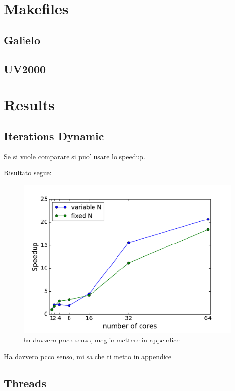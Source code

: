 \documentclass[a4paper,12pt]{article}
\begin{document}
\begin{appendices}

\section{Makefiles} \label{app:makefiles}
\subsection{Galielo}


\newpage
\subsection{UV2000}



\newpage
\section{Results}
\subsection{Iterations Dynamic} \label{app:IterationDynamic}
Se si vuole comparare si puo' usare lo speedup. 

Risultato segue:

\begin{figure}[hhh!]
	\centerline{\includegraphics[width=0.6\linewidth]{fixed_vs_variable_speedup.pdf}}
	\caption{ ha davvero poco senso, meglio mettere in appendice.
	}
	\label{fig:fixedvsvariablespeedup}
\end{figure}

Ha davvero poco senso, mi sa che ti metto in appendice
\subsection{Threads}\label{app:Threads}


\end{appendices}
\end{document}
